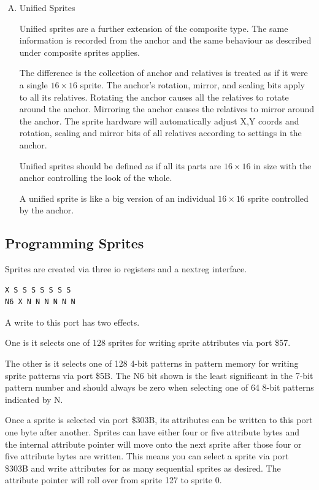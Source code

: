 \begin{enumerate}[A.]
\item Unified Sprites

  Unified sprites are a further extension of the
  composite type. The same information is recorded from the anchor and
  the same behaviour as described under composite sprites applies.

  The difference is the collection of anchor and relatives is treated
  as if it were a single $16\times16$ sprite. The anchor’s rotation,
  mirror, and scaling bits apply to all its relatives. Rotating the
  anchor causes all the relatives to rotate around the
  anchor. Mirroring the anchor causes the relatives to mirror around
  the anchor. The sprite hardware will automatically adjust X,Y coords
  and rotation, scaling and mirror bits of all relatives according to
  settings in the anchor.

  Unified sprites should be defined as if all its parts are
  $16\times16$ in size with the anchor controlling the look of the
  whole.

  A unified sprite is like a big version of an individual $16\times16$
  sprite controlled by the anchor.
\end{enumerate}

\subsection{Programming Sprites}

Sprites are created via three io registers and a nextreg interface.


\begin{verbatim}
X S S S S S S S
N6 X N N N N N N
\end{verbatim}
A write to this port has two effects.

One is it selects one of 128 sprites for writing sprite attributes via
port \$57.

The other is it selects one of 128 4-bit patterns in pattern memory
for writing sprite patterns via port \$5B. The N6 bit shown is the
least significant in the 7-bit pattern number and should always be
zero when selecting one of 64 8-bit patterns indicated by N.



Once a sprite is selected via port \$303B, its attributes can be
written to this port one byte after another. Sprites can have either
four or five attribute bytes and the internal attribute pointer will
move onto the next sprite after those four or five attribute bytes are
written. This means you can select a sprite via port \$303B and write
attributes for as many sequential sprites as desired. The attribute
pointer will roll over from sprite 127 to sprite 0.

